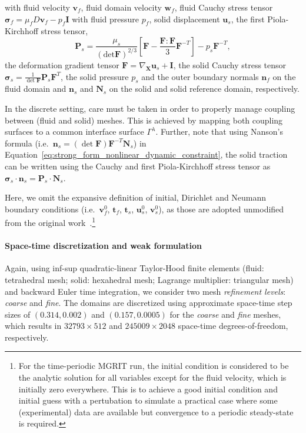 \documentclass[3p]{elsarticle}
\begin{document}
with fluid velocity $\boldsymbol{v}_f$,
fluid domain velocity $\boldsymbol{w}_f$,
fluid Cauchy stress tensor
$\boldsymbol{\sigma}_f = \mu_f D \boldsymbol{v}_f - p_f \boldsymbol{I}$
with fluid pressure $p_f$,
solid displacement $\boldsymbol{u}_s$,
the first Piola-Kirchhoff stress tensor,
\begin{equation*}
	\boldsymbol{P}_s = \frac{\mu_s}{(\text{det}\boldsymbol{F})^{2/3}}
	 \left[\boldsymbol{F} - \frac{\boldsymbol{F} : \boldsymbol{F}}{3} \boldsymbol{F}^{-T}\right] - p_s \boldsymbol{F}^{-T},
\end{equation*}
the deformation gradient tensor
$\boldsymbol{F} = \nabla_{\boldsymbol{X}} \boldsymbol{u}_s + \boldsymbol{I}$,
the solid Cauchy stress tensor
$\boldsymbol{\sigma}_s = \frac{1}{\det{\boldsymbol{F}}} \boldsymbol{P}_s \boldsymbol{F}^T$,
the solid pressure $p_s$
and the outer boundary normals $\boldsymbol{n}_f$ on the fluid domain
and $\boldsymbol{n}_s$ and $\boldsymbol{N}_s$
on the solid and solid reference domain, respectively.

In the discrete setting, care must be taken in order to properly manage
coupling between (fluid and solid) meshes.
This is achieved by mapping both coupling surfaces to a common interface surface $\Gamma^\lambda$.
Further, note that using Nanson's formula
(i.e.\ $\boldsymbol{n}_s = (\det \boldsymbol{F}) \boldsymbol{F}^{-T} \boldsymbol{N}_s$)
in Equation~\ref{eq:strong_form_nonlinear_dynamic_constraint},
the solid traction can be written using
the Cauchy and first Piola-Kirchhoff stress tensor as
$\boldsymbol{\sigma}_s \cdot \boldsymbol{n}_s = \boldsymbol{P}_s \cdot \boldsymbol{N}_s$.

Here, we omit the expansive definition of initial, Dirichlet and Neumann boundary conditions
(i.e.\ $\boldsymbol{v}_f^0$, $\boldsymbol{t}_f$, $\boldsymbol{t}_s$, $\boldsymbol{u}_s^0$, $\boldsymbol{v}_s^0$),
as those are adopted unmodified from the original work~\cite{HessenthalerBalmusRoehrleNordsletten2020}.\footnote{For the time-periodic MGRIT run,
the initial condition is considered to be the analytic solution for all variables except
for the fluid velocity, which is initially zero everywhere.
This is to achieve a good initial condition and initial guess with a pertubation
to simulate a practical case where some (experimental) data are available
but convergence to a periodic steady-state is required.}
\paragraph{Space-time discretization and weak formulation}
Again, using inf-sup quadratic-linear Taylor-Hood finite elements
(fluid: tetrahedral mesh; solid: hexahedral mesh; Lagrange multiplier: triangular mesh)
and backward Euler time integration,
we consider two mesh \emph{refinement levels}: \emph{coarse} and \emph{fine}.
The domains are discretized using approximate space-time step sizes of $(0.314, 0.002)$
and $(0.157, 0.0005)$ for the \emph{coarse} and \emph{fine} meshes,
which results in $32793 \times 512$ and $245009 \times 2048$ space-time degrees-of-freedom,
respectively.
\end{document}
